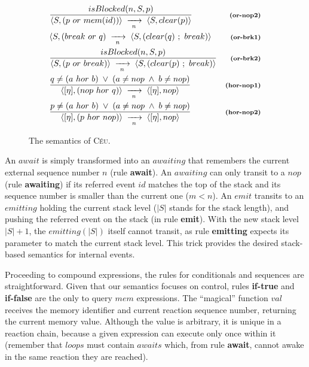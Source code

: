 \documentclass{acm_proc_article-sp}
\newcommand{\CEU}{\textsc{C\'{e}u}\xspace}
\newcommand{\code}[1] {{\small{\texttt{#1}}}}
\newcommand{\ST}{\1\xrightarrow[~n~]{}\1}
\newcommand{\LL}{\langle}
\newcommand{\RR}{\rangle}
\newcommand{\DS}{\displaystyle}
\newcommand{\rr}[1] {{\textbf{\scriptsize{#1}}}}
\newcommand{\1}{\;}
\newcommand{\2}{\;\;}
\newcommand{\3}{\;\;\;}
\newcommand{\5}{\;\;\;\;\;}
\begin{document}
\begin{figure}
{\begin{eqnarray*}
& \frac
    {\DS isBlocked(n,S,p) }
    {\DS \LL S, (p~or~mem(id)) \RR \ST \LL S, clear(p) \RR }
    & \rr{(or-nop2)}   \\
& \LL S, (break~or~q) \ST \LL S, (clear(q)~;~break) \RR
    & \rr{(or-brk1)}   \\
& \frac
    {\DS isBlocked(n,S,p) }
    {\DS \LL S, (p~or~break) \RR \ST \LL S, (clear(p)~;~break) \RR }
    & \rr{(or-brk2)}   \\
& \frac
    {\DS q \neq (a~hor~b) \1\vee\1 (a \neq nop \1\wedge\1 b \neq nop) }
    {\DS \LL [\eta], (nop~hor~q) \RR \ST \LL [\eta], nop \RR }
    & \rr{(hor-nop1)}   \\
& \frac
    {\DS p \neq (a~hor~b) \1\vee\1 (a \neq nop \1\wedge\1 b \neq nop) }
    {\DS \LL [\eta], (p~hor~nop) \RR \ST \LL [\eta], nop \RR }
    & \rr{(hor-nop2)}
%
\end{eqnarray*}
}
%
\caption{ The semantics of \CEU.
\label{fig.sem}
}
\end{figure}

An $await$ is simply transformed into an $awaiting$ that remembers the current 
external sequence number $n$ (rule \textbf{await}).
An $awaiting$ can only transit to a $nop$ (rule \textbf{awaiting}) if its 
referred event $id$ matches the top of the stack and its sequence number is 
smaller than the current one ($m<n$).
%
%
An $emit$ transits to an $emitting$ holding the current stack level ($|S|$ 
stands for the stack length), and pushing the referred event on the stack (in 
rule \textbf{emit}).
With the new stack level $|S|+1$, the $emitting(|S|)$ itself cannot transit, as 
rule \textbf{emitting} expects its parameter to match the current stack level.
This trick provides the desired stack-based semantics for internal events.

Proceeding to compound expressions, the rules for conditionals and sequences 
are straightforward.
%
Given that our semantics focuses on control, rules \textbf{if-true} and 
\textbf{if-false} are the only to query $mem$ expressions.
%
The ``magical'' function $val$ receives the memory identifier and current 
reaction sequence number, returning the current memory value.
%
Although the value is arbitrary, it is unique in a reaction chain, because a 
given expression can execute only once within it (remember that $loops$ must 
contain $awaits$ which, from rule \textbf{await}, cannot awake in the same 
reaction they are reached).
\end{document}
